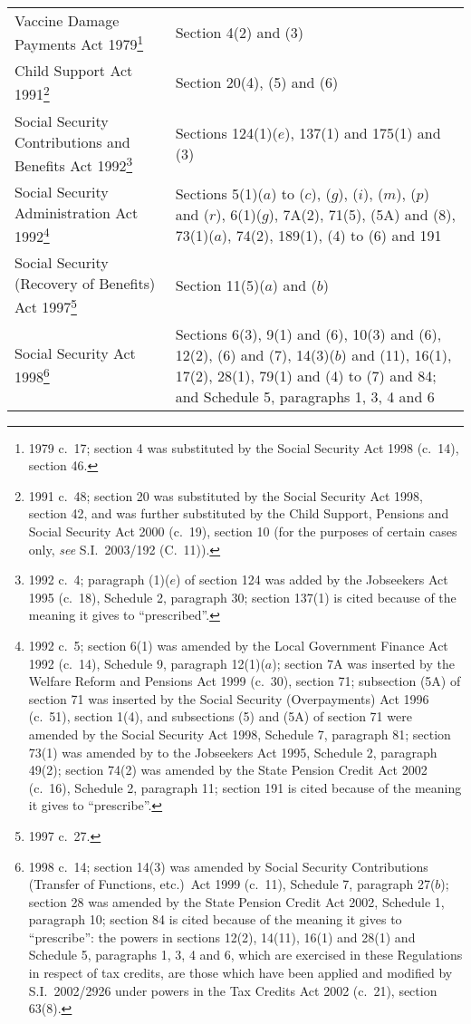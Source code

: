 \documentclass[12pt,a4paper]{article}
\begin{document}
{\noindent{}
\begin{longtable}{p{94.09729pt}p{271.91016pt}}
\hline
\endhead
\hline
\endlastfoot
Vaccine Damage Payments Act 1979\footnote{1979 c.\ 17; section 4 was substituted by the Social Security Act 1998 (c.\ 14), section 46.}	&Section 4(2) and (3)\\
Child Support Act 1991\footnote{1991 c.\ 48; section 20 was substituted by the Social Security Act 1998, section 42, and was further substituted by the Child Support, Pensions and Social Security Act 2000 (c.\ 19), section 10 (for the purposes of certain cases only, \emph{see} S.I.\ 2003/192 (C.\ 11)).}	&Section 20(4), (5) and (6)\\
Social Security Contributions and Benefits Act 1992\footnote{1992 c.\ 4; paragraph (1)($e$)  of section 124 was added by the Jobseekers Act 1995 (c.\ 18), Schedule 2, paragraph 30; section 137(1) is cited because of the meaning it gives to “prescribed”.}	&Sections 124(1)($e$), 137(1) and 175(1) and (3)\\
Social Security Administration Act 1992\footnote{1992 c.\ 5; section 6(1) was amended by the Local Government Finance Act 1992 (c.\ 14), Schedule 9, paragraph 12(1)($a$); section 7A was inserted by the Welfare Reform and Pensions Act 1999 (c.\ 30), section 71; subsection (5A) of section 71 was inserted by the Social Security (Overpayments) Act 1996 (c.\ 51), section 1(4), and subsections (5) and (5A) of section 71 were amended by the Social Security Act 1998, Schedule 7, paragraph 81; section 73(1) was amended by to the Jobseekers Act 1995, Schedule 2, paragraph 49(2); section 74(2) was amended by the State Pension Credit Act 2002 (c.\ 16), Schedule 2, paragraph 11; section 191 is cited because of the meaning it gives to “prescribe”.}	&Sections 5(1)($a$)  to ($c$), ($g$), ($i$), ($m$), ($p$)  and ($r$), 6(1)($g$), 7A(2), 71(5), (5A) and (8), 73(1)($a$), 74(2), 189(1), (4) to (6) and 191\\
Social Security (Recovery of Benefits) Act 1997\footnote{1997 c.\ 27.}	&Section 11(5)($a$)  and ($b$)\\ 
Social Security Act 1998\footnote{1998 c.\ 14; section 14(3) was amended by Social Security Contributions (Transfer of Functions, etc.)\ Act 1999 (c.\ 11), Schedule 7, paragraph 27($b$); section 28 was amended by the State Pension Credit Act 2002, Schedule 1, paragraph 10; section 84 is cited because of the meaning it gives to “prescribe”: the powers in sections 12(2), 14(11), 16(1) and 28(1) and Schedule 5, paragraphs 1, 3, 4 and 6, which are exercised in these Regulations in respect of tax credits, are those which have been applied and modified by S.I.\ 2002/2926 under powers in the Tax Credits Act 2002 (c.\ 21), section 63(8).}	&Sections 6(3), 9(1) and (6), 10(3) and (6), 12(2), (6) and (7), 14(3)($b$)  and (11), 16(1), 17(2), 28(1), 79(1) and (4) to (7) and 84; and Schedule 5, paragraphs 1, 3, 4 and 6\\

\end{longtable}}
\end{document}
